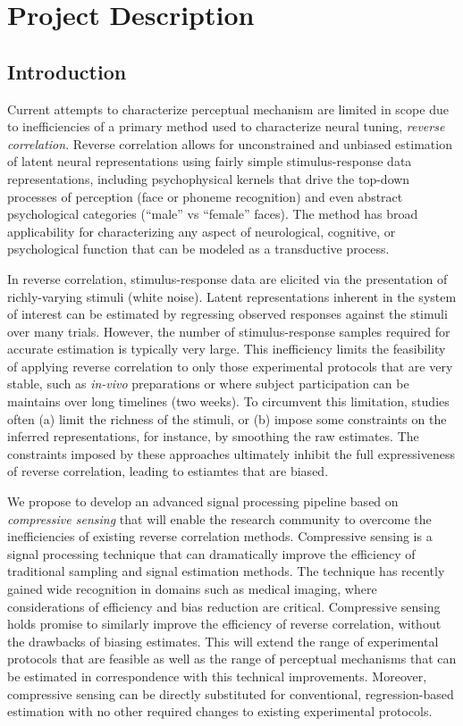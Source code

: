 \section{Project Description}

\subsection{Introduction}

Current attempts to characterize perceptual mechanism are limited in scope due to inefficiencies of a primary method used to characterize neural tuning, \emph{reverse correlation}.
Reverse correlation allows for unconstrained and unbiased estimation of latent neural representations using fairly simple stimulus-response data representations,
including psychophysical kernels that drive the top-down processes of perception (\eg face or phoneme recognition)
and even abstract psychological categories (\eg ``male'' vs ``female'' faces).
The method has broad applicability for characterizing any aspect of neurological, cognitive, or psychological function that can be modeled as a transductive process.

In reverse correlation, stimulus-response data are elicited via the presentation of richly-varying stimuli (\eg white noise).
Latent representations inherent in the system of interest can be estimated by regressing observed responses against the stimuli over many trials.
However, the number of stimulus-response samples required for accurate estimation is typically very large.
This inefficiency limits the feasibility of applying reverse correlation to only those experimental protocols that are very stable, such as \emph{in-vivo} preparations or where subject participation can be maintains over long timelines (\ie two weeks).
To circumvent this limitation, studies often (a) limit the richness of the stimuli, or (b) impose some constraints on the inferred representations,
for instance, by smoothing the raw estimates.
The constraints imposed by these approaches ultimately inhibit the full expressiveness of reverse correlation, leading to estiamtes that are biased.

We propose to develop an advanced signal processing pipeline based on \emph{compressive sensing} that will enable the research community to overcome the inefficiencies of existing reverse correlation methods.
Compressive sensing is a signal processing technique that can dramatically improve the efficiency of traditional sampling and signal estimation methods.
The technique has recently gained wide recognition in domains such as medical imaging,
where considerations of efficiency and bias reduction are critical.
Compressive sensing holds promise to similarly improve the efficiency of reverse correlation,
without the drawbacks of biasing estimates.
This will extend the range of experimental protocols that are feasible
as well as the range of perceptual mechanisms that can be estimated in correspondence with this technical improvements.
Moreover, compressive sensing can be directly substituted for conventional, regression-based estimation
with no other required changes to existing experimental protocols.

